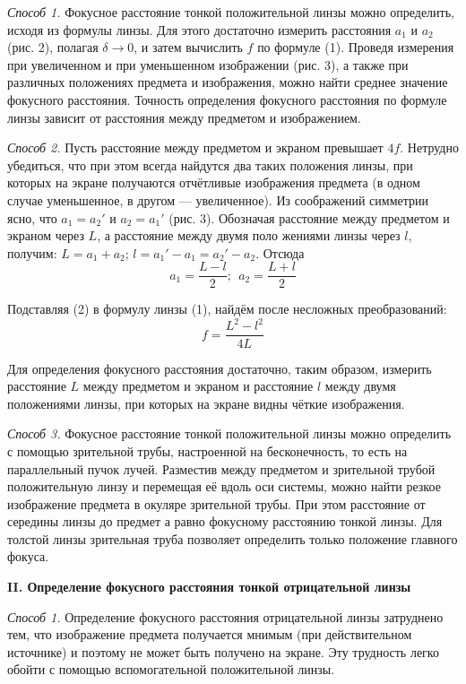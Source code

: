 \documentclass[14pt]{article}
\begin{document}
\textsl{Способ 1.} Фокусное расстояние тонкой положительной линзы можно
определить, исходя из формулы линзы. Для этого достаточно измерить
расстояния $a_1$ и $a_2$ (рис. 2), полагая $\delta \rightarrow 0$, и затем вычислить
$f$ по формуле (1).
Проведя измерения при увеличенном
и при уменьшенном изображении
(рис. 3),
а также при различных положениях
предмета и изображения, можно
найти среднее значение фокусного расстояния.
Точность определения фокусного расстояния
по формуле линзы зависит от
расстояния между предметом
и изображением.


\textsl{Способ 2.} Пусть расстояние между предметом
и экраном превышает $4f$. Нетрудно убедиться, что при этом всегда найдутся два таких
положения линзы, при
которых на экране получаются отчётливые изображения
предмета (в одном случае уменьшенное, в другом
— увеличенное). Из соображений симметрии ясно, что
$a_1 = a_2'$ и $a_2 = a_1'$ (рис. 3).
Обозначая расстояние между предметом
и экраном через
$L$, а расстояние
между двумя поло
жениями линзы через $l$, получим:
$L = a_1 + a_2$; $l = a_1' − a_1 = a_2' − a_2$. Отсюда
\begin{equation}
a_1 = \frac{L-l}{2};~~a_2 = \frac{L+l}{2}
\end{equation}

Подставляя (2) в формулу линзы (1), найдём после несложных преобразований:
\begin{equation}
f = \frac{L^2 - l^2}{4L}
\end{equation}

Для определения фокусного расстояния достаточно, таким образом, измерить
расстояние
$L$ между предметом
и экраном
и расстояние $l$ между
двумя положениями линзы, при
которых на экране видны чёткие изображения.


\textsl{Способ 3.} Фокусное расстояние тонкой положительной линзы можно
определить с помощью зрительной трубы, настроенной на бесконечность,
то есть на параллельный пучок лучей.
Разместив между предметом
и зрительной трубой положительную
линзу
и перемещая её вдоль оси системы, можно найти резкое изображение
предмета в окуляре зрительной трубы. При этом расстояние от
середины линзы до предмет
а равно фокусному расстоянию тонкой линзы.
Для толстой линзы зрительная труба позволяет определить только
положение главного фокуса.

\vspace{1cm}
\textbf{II. Определение фокусного расстояния тонкой отрицательной линзы}

\textsl{Способ 1.} Определение фокусного расстояния отрицательной линзы
затруднено тем, что изображение предмета получается мнимым
(при действительном источнике)
и поэтому не может быть получено на
экране. Эту трудность легко обойти с помощью вспомогательной положительной
линзы.
\end{document}
